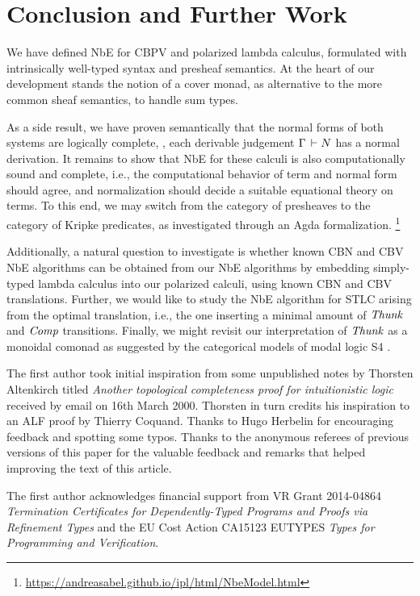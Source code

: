 \documentclass[sigconf,screen,fleqn]{acmart} %
\begin{document}
\section{Conclusion and Further Work}
\label{sec:concl}

We have defined NbE for CBPV and polarized lambda calculus,
formulated with intrinsically well-typed syntax and presheaf
semantics.  At the heart of our development stands the notion of a
cover monad, as alternative to the more common sheaf semantics, to
handle sum types.

As a side result, we have proven semantically
that the normal forms of both systems are logically complete, \ie,
each derivable judgement $\Gamma \,\vdash N$ has a normal derivation.
It remains to show that NbE for these calculi is also computationally
sound and complete, i.e., the computational behavior of term and
normal form should agree, and normalization should decide a suitable
equational theory on terms.  To this end, we may switch from the
category of presheaves to the category of Kripke predicates, as
investigated through an Agda formalization.%
\footnote{\url{https://andreasabel.github.io/ipl/html/NbeModel.html}}

Additionally, a natural question to investigate is whether known CBN
and CBV NbE algorithms can be obtained from our NbE algorithms by
embedding simply-typed lambda calculus into our polarized calculi,
using known CBN and CBV translations.  Further, we would like to study
the NbE algorithm for STLC arising from the optimal translation, i.e.,
the one inserting a minimal amount of $\mathit{Thunk}$ and $\mathit{Comp}$ transitions.
Finally, we might revisit our interpretation of $\mathit{Thunk}$ as a monoidal
comonad as suggested by the categorical models of modal logic S4
\cite{alechinaMendlerDePaivaRitter:csl01}.

\begin{acks}
The first author took initial inspiration from some
  unpublished notes by Thorsten Altenkirch titled
\emph{Another topological completeness proof for intuitionistic logic}
received by email on 16th March 2000.
Thorsten in turn credits his inspiration to an ALF proof by Thierry
Coquand.  Thanks to Hugo Herbelin for encouraging feedback and spotting some
typos.  Thanks to the anonymous referees of previous versions of this
paper for the valuable feedback and remarks that helped improving the
text of this article.

The first author acknowledges financial support from
VR Grant 2014-04864 \emph{Termination
      Certificates for Dependently-Typed Programs and Proofs via
      Refinement Types}
and the EU Cost Action CA15123 EUTYPES \emph{Types for Programming and Verification}.
\end{acks}




\end{document}
